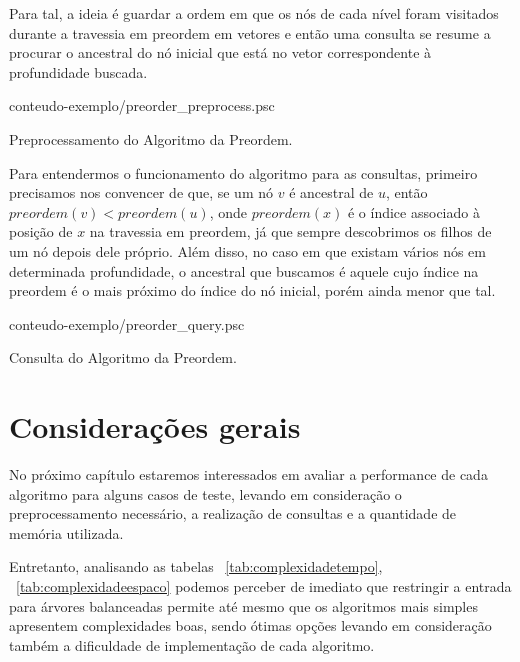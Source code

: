 Para tal, a ideia é guardar a ordem em que os nós de cada nível
foram visitados durante a travessia em preordem em vetores e então uma consulta se
resume a procurar o ancestral do nó inicial que está no vetor correspondente à
profundidade buscada.

\begin{program}[h!]
  
  {conteudo-exemplo/preorder_preprocess.psc}

  \caption{Preprocessamento do Algoritmo da Preordem.\label{prog:preorderproc}}
\end{program}

Para entendermos o funcionamento do algoritmo para as consultas, primeiro precisamos
nos convencer de que, se um nó $v$ é ancestral de $u$, então $preordem(v) < preordem(u)$,
onde $preordem(x)$ é o índice associado à posição de $x$ na travessia em preordem, já
que sempre descobrimos os filhos de um nó depois dele próprio. Além disso, no caso em
que existam vários nós em determinada profundidade, o ancestral que buscamos é aquele
cujo índice na preordem é o mais próximo do índice do nó inicial, porém ainda menor
que tal.

\begin{program}[]
  
  {conteudo-exemplo/preorder_query.psc}

  \caption{Consulta do Algoritmo da Preordem.\label{prog:preorderquery}}
\end{program}

\section{Considerações gerais}
No próximo capítulo estaremos interessados em avaliar a performance de cada algoritmo
para alguns casos de teste, levando em consideração o preprocessamento necessário,
a realização de consultas e a quantidade de memória utilizada.

Entretanto, analisando as tabelas ~\ref{tab:complexidadetempo},
~\ref{tab:complexidadeespaco} podemos perceber de imediato que restringir a entrada
para árvores balanceadas permite até mesmo que os algoritmos mais simples apresentem
complexidades boas, sendo ótimas opções levando em consideração também a dificuldade
de implementação de cada algoritmo.


